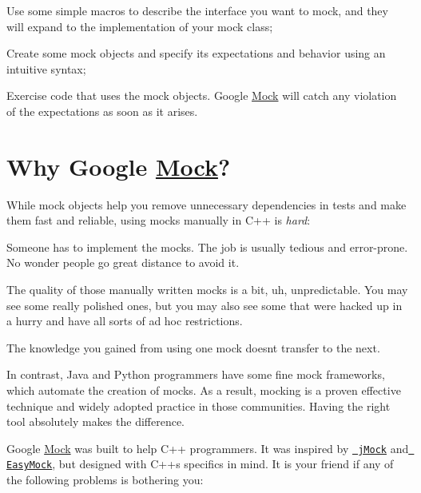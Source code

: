 \begin{DoxyEnumerate}
\item Use some simple macros to describe the interface you want to mock, and they will expand to the implementation of your mock class;
\end{DoxyEnumerate}
\begin{DoxyEnumerate}
\item Create some mock objects and specify its expectations and behavior using an intuitive syntax;
\end{DoxyEnumerate}
\begin{DoxyEnumerate}
\item Exercise code that uses the mock objects. Google \mbox{\hyperlink{class_mock}{Mock}} will catch any violation of the expectations as soon as it arises.
\end{DoxyEnumerate}

\section*{Why Google \mbox{\hyperlink{class_mock}{Mock}}?}

While mock objects help you remove unnecessary dependencies in tests and make them fast and reliable, using mocks manually in C++ is {\itshape hard}\+:


\begin{DoxyItemize}
\item Someone has to implement the mocks. The job is usually tedious and error-\/prone. No wonder people go great distance to avoid it.
\item The quality of those manually written mocks is a bit, uh, unpredictable. You may see some really polished ones, but you may also see some that were hacked up in a hurry and have all sorts of ad hoc restrictions.
\item The knowledge you gained from using one mock doesn\textquotesingle{}t transfer to the next.
\end{DoxyItemize}

In contrast, Java and Python programmers have some fine mock frameworks, which automate the creation of mocks. As a result, mocking is a proven effective technique and widely adopted practice in those communities. Having the right tool absolutely makes the difference.

Google \mbox{\hyperlink{class_mock}{Mock}} was built to help C++ programmers. It was inspired by \href{http://www.jmock.org/}\texttt{ j\+Mock} and \href{http://www.easymock.org/}\texttt{ Easy\+Mock}, but designed with C++\textquotesingle{}s specifics in mind. It is your friend if any of the following problems is bothering you\+:


